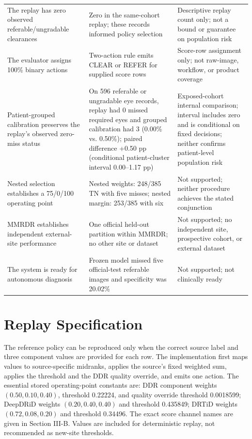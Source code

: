 \documentclass{ieeeaccess}
\begin{document}
\begin{table}[t]
\begin{tabularx}{\textwidth}{>{\raggedright\arraybackslash}p{}>{\raggedright\arraybackslash}p{}>{\raggedright\arraybackslash}X}
The replay has zero observed referable/ungradable clearances & Zero in the same-cohort replay; these records informed policy selection & Descriptive replay count only; not a bound or guarantee on population risk \\
The evaluator assigns 100\% binary actions & Two-action rule emits CLEAR or REFER for supplied score rows & Score-row assignment only; not raw-image, workflow, or product coverage \\
Patient-grouped calibration preserves the replay's observed zero-miss status & On 596 referable or ungradable eye records, replay had 0 missed required eyes and grouped calibration had 3 (0.00\% vs. 0.50\%); paired difference +0.50 pp (conditional patient-cluster interval 0.00--1.17 pp) & Exposed-cohort internal comparison; interval includes zero and is conditional on fixed decisions; neither confirms patient-level population risk \\
Nested selection establishes a 75/0/100 operating point & Nested weights: 248/385 TN with five misses; nested margin: 253/385 with six & Not supported; neither procedure achieves the stated conjunction \\
MMRDR establishes independent external-site performance & One official held-out partition within MMRDR; no other site or dataset & Not supported; no independent site, prospective cohort, or external dataset \\
The system is ready for autonomous diagnosis & Frozen model missed five official-test referable images and specificity was 20.02\% & Not supported; not clinically ready \\
\bottomrule
\end{tabularx}
\end{table}

\appendices
\section{Replay Specification}
The reference policy can be reproduced only when the correct source label and three component values are provided for each row. The implementation first maps values to source-specific midranks, applies the source's fixed weighted sum, applies the threshold and the DDR quality override, and emits one action. The essential stored operating-point constants are: DDR component weights $(0.50,0.10,0.40)$, threshold 0.22224, and quality override threshold 0.0018599; DeepDRiD weights $(0.20,0.40,0.40)$ and threshold 0.435849; DRTiD weights $(0.72,0.08,0.20)$ and threshold 0.34496. The exact score channel names are given in Section III-B. Values are included for deterministic replay, not recommended as new-site thresholds.
\end{document}
